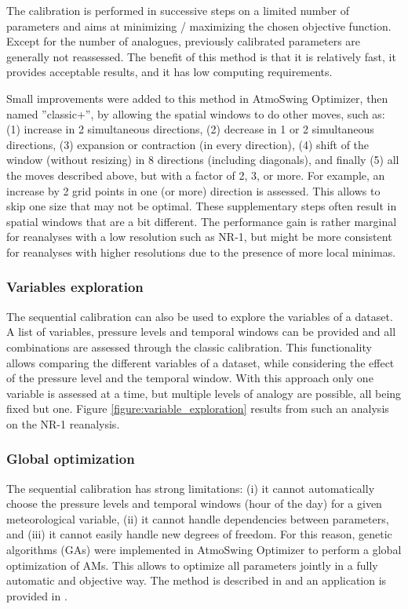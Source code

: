 \documentclass[review]{elsarticle}
\begin{document}
The calibration is performed in successive steps on a limited number of parameters and aims at minimizing / maximizing the chosen objective function. Except for the number of analogues, previously calibrated parameters are generally not reassessed. The benefit of this method is that it is relatively fast, it provides acceptable results, and it has low computing requirements. 

Small improvements were added to this method in AtmoSwing Optimizer, then named ''classic+'', by allowing the spatial windows to do other moves, such as: (1) increase in 2 simultaneous directions, (2) decrease in 1 or 2 simultaneous directions, (3) expansion or contraction (in every direction), (4) shift of the window (without resizing) in 8 directions (including diagonals), and finally (5) all the moves described above, but with a factor of 2, 3, or more. For example, an increase by 2 grid points in one (or more) direction is assessed. This allows to skip one size that may not be optimal. These supplementary steps often result in spatial windows that are a bit different. The performance gain is rather marginal for reanalyses with a low resolution such as NR-1, but might be more consistent for reanalyses with higher resolutions due to the presence of more local minimas.


\subsubsection{Variables exploration}
\label{sec:vars-explo}

The sequential calibration can also be used to explore the variables of a dataset. A list of variables, pressure levels and temporal windows can be provided and all combinations are assessed through the classic calibration. This functionality allows comparing the different variables of a dataset, while considering the effect of the pressure level and the temporal window. With this approach only one variable is assessed at a time, but multiple levels of analogy are possible, all being fixed but one. Figure \ref{figure:variable_exploration} results from such an analysis on the NR-1 reanalysis.


\subsubsection{Global optimization}
\label{sec:global-optimization}

The sequential calibration has strong limitations: (i) it cannot automatically choose the pressure levels and temporal windows (hour of the day) for a given meteorological variable, (ii) it cannot handle dependencies between parameters, and (iii) it cannot easily handle new degrees of freedom. For this reason, genetic algorithms (GAs) were implemented in AtmoSwing Optimizer to perform a global optimization of AMs. This allows to optimize all parameters jointly in a fully automatic and objective way. The method is described in \citet{Horton2017a} and an application is provided in \citet{Horton2018a}.
\end{document}

